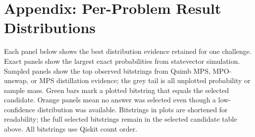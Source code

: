 \clearpage
\section*{Appendix: Per-Problem Result Distributions}
Each panel below shows the best distribution evidence retained for one challenge. Exact panels show the largest exact probabilities from statevector simulation. Sampled panels show the top observed bitstrings from Quimb MPS, MPO-unswap, or MPS distillation evidence; the grey tail is all unplotted probability or sample mass. Green bars mark a plotted bitstring that equals the selected candidate. Orange panels mean no answer was selected even though a low-confidence distribution was available. Bitstrings in plots are shortened for readability; the full selected bitstrings remain in the selected candidate table above. All bitstrings use Qiskit count order.


\clearpage
